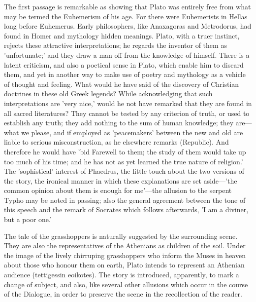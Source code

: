 \documentclass[11pt,letter]{article}
\begin{document}
\par  The first passage is remarkable as showing that Plato was entirely free from what may be termed the Euhemerism of his age. For there were Euhemerists in Hellas long before Euhemerus. Early philosophers, like Anaxagoras and Metrodorus, had found in Homer and mythology hidden meanings. Plato, with a truer instinct, rejects these attractive interpretations; he regards the inventor of them as 'unfortunate;' and they draw a man off from the knowledge of himself. There is a latent criticism, and also a poetical sense in Plato, which enable him to discard them, and yet in another way to make use of poetry and mythology as a vehicle of thought and feeling. What would he have said of the discovery of Christian doctrines in these old Greek legends? While acknowledging that such interpretations are 'very nice,' would he not have remarked that they are found in all sacred literatures? They cannot be tested by any criterion of truth, or used to establish any truth; they add nothing to the sum of human knowledge; they are—what we please, and if employed as 'peacemakers' between the new and old are liable to serious misconstruction, as he elsewhere remarks (Republic). And therefore he would have 'bid Farewell to them; the study of them would take up too much of his time; and he has not as yet learned the true nature of religion.' The 'sophistical' interest of Phaedrus, the little touch about the two versions of the story, the ironical manner in which these explanations are set aside—'the common opinion about them is enough for me'—the allusion to the serpent Typho may be noted in passing; also the general agreement between the tone of this speech and the remark of Socrates which follows afterwards, 'I am a diviner, but a poor one.'

\par  The tale of the grasshoppers is naturally suggested by the surrounding scene. They are also the representatives of the Athenians as children of the soil. Under the image of the lively chirruping grasshoppers who inform the Muses in heaven about those who honour them on earth, Plato intends to represent an Athenian audience (tettigessin eoikotes). The story is introduced, apparently, to mark a change of subject, and also, like several other allusions which occur in the course of the Dialogue, in order to preserve the scene in the recollection of the reader.
\end{document}
